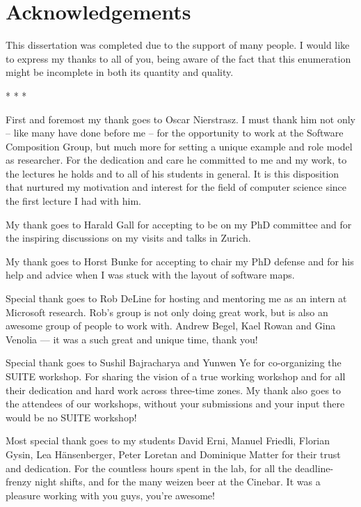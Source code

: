 \chapter*{Acknowledgements}

This dissertation was completed due to the support of many people.
I would like to express my thanks to all of you, being aware of the fact that this enumeration might be incomplete in both its quantity and quality.

\begin{center}* * *\end{center}

First and foremost my thank goes to Oscar Nierstrasz. 
%
I must thank him not only -- like many have done before me -- for the opportunity to work at the Software Composition Group, but much more for setting a unique example and role model as researcher. For the dedication and care he committed to me and my 
work, to the lectures he holds and to all of his students in general. It is this disposition that 
nurtured my motivation and interest for the field of computer science since the first lecture 
I had with him. 

My thank goes to Harald Gall for accepting to be on my PhD committee and for the inspiring discussions on my visits and talks in Zurich. 

My thank goes to Horst Bunke for accepting to chair my PhD defense and for his help and advice when I was stuck with the layout of software maps.

Special thank goes to Rob DeLine for hosting and mentoring me as an intern at Microsoft research. Rob's group is not only doing great work, but is also an awesome group of people to work with. Andrew Begel, Kael Rowan and Gina Venolia --- it was a such great and unique time, thank you!

Special thank goes to Sushil Bajracharya and Yunwen Ye for co-organizing the SUITE workshop. For sharing the vision of a true working workshop and for all their dedication and hard work across three-time zones. My thank also goes to the attendees of our workshops, without your submissions and your input there would be no SUITE workshop!

Most special thank goes to my students David Erni, Manuel Friedli, Florian Gysin, Lea H\"ansenberger, Peter Loretan and Dominique Matter for their trust and dedication. For the countless hours spent in the lab, for all the deadline-frenzy night shifts, and for the many weizen beer at the Cinebar. It was a pleasure working with you guys, you're awesome!

